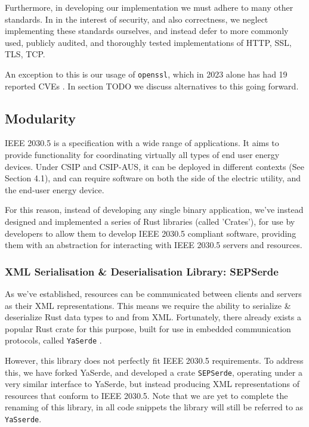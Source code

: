 Furthermore, in developing our implementation we must adhere to many other standards. In in the interest of security, and also correctness, we neglect implementing these standards ourselves, and instead defer to more commonly used, publicly audited, and thoroughly tested implementations of HTTP, SSL, TLS, TCP. 

An exception to this is our usage of \texttt{openssl}, which in 2023 alone has had 19 reported CVEs \cite{OpensslCVE}. In section TODO we discuss alternatives to this going forward.

\subsection{Modularity}
IEEE 2030.5 is a specification with a wide range of applications. It aims to provide functionality for coordinating virtually all types of end user energy devices. Under CSIP and CSIP-AUS, it can be deployed in different contexts (See Section 4.1), and can require software on both the side of the electric utility, and the end-user energy device.

For this reason, instead of developing any single binary application, we've instead designed and implemented a series of Rust libraries (called 'Crates'), for use by developers to allow them to develop IEEE 2030.5 compliant software, providing them with an abstraction for interacting with IEEE 2030.5 servers and resources.

\subsubsection{XML Serialisation \& Deserialisation Library: \- SEPSerde}
As we've established, resources can be communicated between clients and servers as their XML representations. This means we require the ability to serialize \& deserialize Rust data types to and from XML.
Fortunately, there already exists a popular Rust crate for this purpose, built for use in embedded communication protocols, called \texttt{YaSerde} \cite[]{YaSerde}.

However, this library does not perfectly fit IEEE 2030.5 requirements. To address this, we have forked YaSerde, and developed a crate \texttt{SEPSerde}, operating under a very similar interface to YaSerde, but instead producing XML representations of resources that conform to IEEE 2030.5.
Note that we are yet to complete the renaming of this library, in all code snippets the library will still be referred to as \texttt{YaSserde}.

